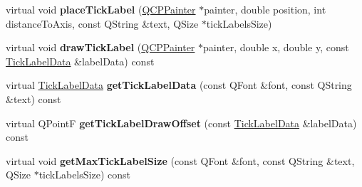 \begin{DoxyCompactItemize}
\item 
virtual void {\bfseries place\+Tick\+Label} (\hyperlink{class_q_c_p_painter}{Q\+C\+P\+Painter} $\ast$painter, double position, int distance\+To\+Axis, const Q\+String \&text, Q\+Size $\ast$tick\+Labels\+Size)\hypertarget{class_q_c_p_axis_painter_private_a829170e248b76a226a68e28f36d8ba6c}{}\label{class_q_c_p_axis_painter_private_a829170e248b76a226a68e28f36d8ba6c}

\item 
virtual void {\bfseries draw\+Tick\+Label} (\hyperlink{class_q_c_p_painter}{Q\+C\+P\+Painter} $\ast$painter, double x, double y, const \hyperlink{struct_q_c_p_axis_painter_private_1_1_tick_label_data}{Tick\+Label\+Data} \&label\+Data) const \hypertarget{class_q_c_p_axis_painter_private_ab5d195e3f413d90fd9328caceaf3d2b3}{}\label{class_q_c_p_axis_painter_private_ab5d195e3f413d90fd9328caceaf3d2b3}

\item 
virtual \hyperlink{struct_q_c_p_axis_painter_private_1_1_tick_label_data}{Tick\+Label\+Data} {\bfseries get\+Tick\+Label\+Data} (const Q\+Font \&font, const Q\+String \&text) const \hypertarget{class_q_c_p_axis_painter_private_a7d22dd56fc4fb2e3f9b820d903183edd}{}\label{class_q_c_p_axis_painter_private_a7d22dd56fc4fb2e3f9b820d903183edd}

\item 
virtual Q\+PointF {\bfseries get\+Tick\+Label\+Draw\+Offset} (const \hyperlink{struct_q_c_p_axis_painter_private_1_1_tick_label_data}{Tick\+Label\+Data} \&label\+Data) const \hypertarget{class_q_c_p_axis_painter_private_ad90002b4eb674b8d462e0de574125b71}{}\label{class_q_c_p_axis_painter_private_ad90002b4eb674b8d462e0de574125b71}

\item 
virtual void {\bfseries get\+Max\+Tick\+Label\+Size} (const Q\+Font \&font, const Q\+String \&text, Q\+Size $\ast$tick\+Labels\+Size) const \hypertarget{class_q_c_p_axis_painter_private_af546f5175352f131eb9b40a6c3970510}{}\label{class_q_c_p_axis_painter_private_af546f5175352f131eb9b40a6c3970510}

\end{DoxyCompactItemize}
